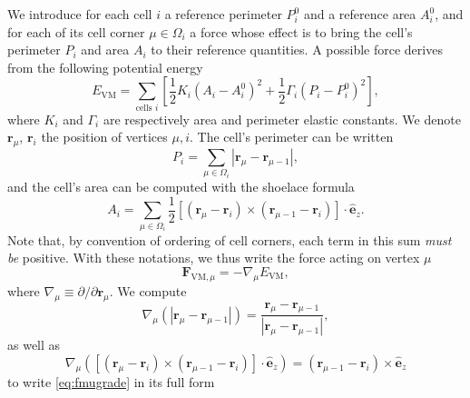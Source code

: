 \documentclass[aps, superscriptaddress, notitlepage]{revtex4-1}
\begin{document}
We introduce for each cell $i$ a reference perimeter $P^0_i$ and a reference area $A^0_i$, and for each of its cell corner $\mu \in \Omega_i$ a force whose effect is to bring the cell's perimeter $P_i$ and area $A_i$ to their reference quantities. A possible force derives from the following potential energy \cite{farhadifar2007influence,fletcher2014vertex,bi2016motilitydriven,sknepnek2023generating}
\begin{equation}
E_{\mathrm{VM}} = \sum_{\text{cells } i} \left[\frac{1}{2} K_i (A_i - A_i^0)^2 + \frac{1}{2} \Gamma_i (P_i - P_i^0)^2\right],
\label{eq:evm}
\end{equation}
where $K_i$ and $\Gamma_i$ are respectively area and perimeter elastic constants. We denote $\boldsymbol{r}_{\mu}$, $\boldsymbol{r}_i$ the position of vertices $\mu, i$. The cell's perimeter can be written
\begin{equation}
P_i = \sum_{\mu \in \Omega_i} |\boldsymbol{r}_{\mu} - \boldsymbol{r}_{\mu - 1}|,
\end{equation}
and the cell's area can be computed with the shoelace formula
\begin{equation}
A_i = \sum_{\mu \in \Omega_i} \frac{1}{2} [(\boldsymbol{r}_{\mu} - \boldsymbol{r}_{i}) \times (\boldsymbol{r}_{\mu - 1} - \boldsymbol{r}_{i})] \cdot \hat{\boldsymbol{e}}_z.
\end{equation}
Note that, by convention of ordering of cell corners, each term in this sum \textit{must be} positive. With these notations, we thus write the force acting on vertex $\mu$
\begin{equation}
\boldsymbol{F}_{\mathrm{VM},\mu} = -\nabla_{\mu} E_{\mathrm{VM}},
\label{eq:fmugrade}
\end{equation}
where $\nabla_{\mu} \equiv \partial/\partial \boldsymbol{r}_{\mu}$. We compute
\begin{equation}
\nabla_{\mu} \left(|\boldsymbol{r}_{\mu} - \boldsymbol{r}_{\mu - 1}|\right) = \frac{\boldsymbol{r}_{\mu} - \boldsymbol{r}_{\mu - 1}}{|\boldsymbol{r}_{\mu} - \boldsymbol{r}_{\mu - 1}|},
\end{equation}
as well as
\begin{equation}
\nabla_{\mu} \left([(\boldsymbol{r}_{\mu} - \boldsymbol{r}_i) \times (\boldsymbol{r}_{\mu - 1} - \boldsymbol{r}_i)] \cdot \hat{\boldsymbol{e}}_z\right) = (\boldsymbol{r}_{\mu - 1} - \boldsymbol{r}_i) \times \hat{\boldsymbol{e}}_z
\end{equation}
to write \eqref{eq:fmugrade} in its full form
\end{document}
